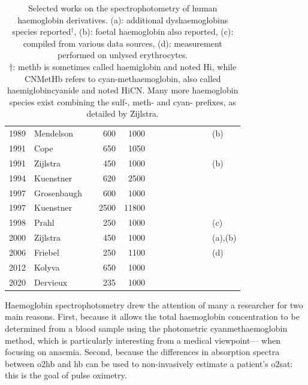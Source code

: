 \begin{table}[ht]
\begin{adjustbox}{center}
\begin{tabular}{lllrrcccccccl}
			1989 & Mendelson & \cite{mendelson1989} & 600 & 1000 & \checkmark & \checkmark &  &  &  &  &  & (b) \\ %
			1991 & Cope & \cite{cope1991} & 650 & 1050 & \checkmark & \checkmark &  &  &  &  &  & \\
			1991 & Zijlstra & \cite{zijlstra1991} & 450 & 1000 & \checkmark & \checkmark & \checkmark & \checkmark &  &  &  & (b) \\
			1994 & Kuenstner & \cite{kuenstner1994} & 620 & 2500 & \checkmark & \checkmark & \checkmark & \checkmark &  &  &  & \\
			1997 & Grosenbaugh & \cite{grosenbaugh1997} & 600 & 1000 & \checkmark & \checkmark &  &  &  &  &  & \\
			1997 & Kuenstner & \cite{kuenstner1994} & 2500 & 11800 & \checkmark & \checkmark & \checkmark & \checkmark &  &  &  & \\
			1998 & Prahl & \cite{prahl1998} & 250 & 1000 & \checkmark & \checkmark &  &  &  &  &  & (c)\\
			2000 & Zijlstra & \cite{zijlstra2000} & 450 & 1000 & \checkmark & \checkmark & \checkmark & \checkmark & \checkmark & \checkmark &  & (a),(b)\\
			2006 & Friebel & \cite{friebel2006} & 250 & 1100 &  & \checkmark &  &  &  &  &  & (d)\\
			2012 & Kolyva & \cite{kolyva2012} & 650 & 1000 & \checkmark & \checkmark &  &  &  &  &  & \\
			2020 & Dervieux & \cite{dervieux2020} & 235 & 1000 & \checkmark & \checkmark &  &  &  &  & \checkmark & 
		\end{tabular}
	\end{adjustbox}
	\caption[Selected works on the spectrophotometry of human haemoglobin derivatives.]{Selected works on the spectrophotometry of human haemoglobin derivatives. (a): additional dyshaemoglobins species reported$^\dagger$, (b): foetal haemoglobin also reported, (c): compiled from various data sources, (d): measurement performed on unlysed erythrocytes.\\
	$\dagger$: \gls{methb} is sometimes called haemiglobin and noted Hi, while CNMetHb refers to cyan-methaemoglobin, also called haemiglobincyanide and noted HiCN. Many more haemoglobin species exist combining the sulf-, meth- and cyan- prefixes, as detailed by Zijlstra\cite[p.~11 and Figure~2.2]{zijlstra2000}.}\label{tab:co2hb:hb_biblio}
\end{table}

Haemoglobin spectrophotometry drew the attention of many a researcher for two main reasons. First, because it allows the total haemoglobin concentration to be determined from a blood sample using the photometric cyanmethaemoglobin method\cite{vankampen1983}, which is particularly interesting from a medical viewpoint---\eg{} when focusing on anaemia\cite{neufeld2019}. Second, because the differences in absorption spectra between \gls{o2hb} and \gls{hb} can be used to non-invasively estimate a patient's \gls{o2sat}: this is the goal of pulse oximetry.

